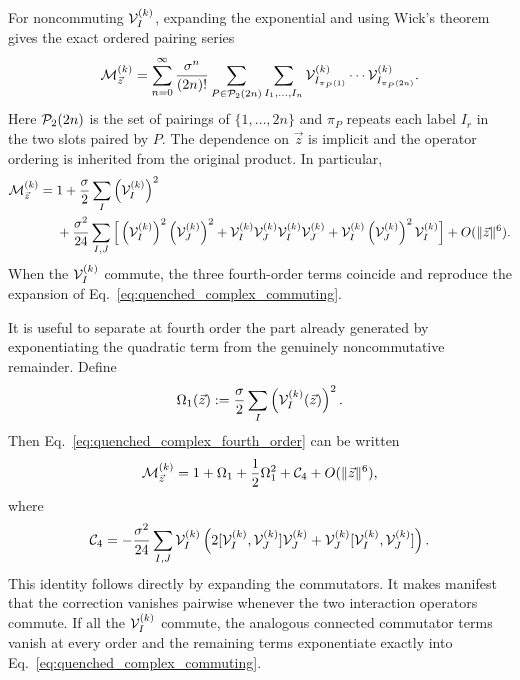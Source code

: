 \documentclass{article}
\theoremstyle{definition}
\begin{document}
For noncommuting ${\cal V}_I^{(k)}$, expanding the exponential and using Wick's theorem gives the exact ordered pairing series
\begin{equation}
    {\cal M}_{\vec z}^{(k)}
    =\sum_{n=0}^{\infty}\frac{\sigma^n}{(2n)!}
    \sum_{P\in{\cal P}_2(2n)}
    \sum_{I_1,\ldots,I_n}
    {\cal V}_{I_{\pi_P(1)}}^{(k)}\cdots
    {\cal V}_{I_{\pi_P(2n)}}^{(k)}.
    \label{eq:quenched_complex_ordered_wick}
\end{equation}
Here ${\cal P}_2(2n)$ is the set of pairings of $\{1,\ldots,2n\}$ and $\pi_P$ repeats each label $I_r$ in the two slots paired by $P$. The dependence on $\vec z$ is implicit and the operator ordering is inherited from the original product. In particular,
\begin{align}
    {\cal M}_{\vec z}^{(k)}={}&1
    +\frac{\sigma}{2}\sum_I\left({\cal V}_I^{(k)}\right)^2
    \nonumber\\
    &+\frac{\sigma^2}{24}\sum_{I,J}\Big[
        \left({\cal V}_I^{(k)}\right)^2
        \left({\cal V}_J^{(k)}\right)^2
        +{\cal V}_I^{(k)}{\cal V}_J^{(k)}
         {\cal V}_I^{(k)}{\cal V}_J^{(k)}
        +{\cal V}_I^{(k)}
         \left({\cal V}_J^{(k)}\right)^2
         {\cal V}_I^{(k)}
    \Big]+O(\|\vec z\|^6).
    \label{eq:quenched_complex_fourth_order}
\end{align}
When the ${\cal V}_I^{(k)}$ commute, the three fourth-order terms coincide and reproduce the expansion of Eq.~\eqref{eq:quenched_complex_commuting}.

It is useful to separate at fourth order the part already generated by exponentiating the quadratic term from the genuinely noncommutative remainder. Define
\begin{equation}
    \Omega_1(\vec z)
    :=\frac{\sigma}{2}\sum_I\left({\cal V}_I^{(k)}(\vec z)\right)^2.
    \label{eq:quenched_Omega1_complex}
\end{equation}
Then Eq.~\eqref{eq:quenched_complex_fourth_order} can be written
\begin{equation}
    {\cal M}_{\vec z}^{(k)}
    =1+\Omega_1+\frac12\Omega_1^2+{\cal C}_4+O(\|\vec z\|^6),
    \label{eq:quenched_fourth_split}
\end{equation}
where
\begin{equation}
    {\cal C}_4
    =-\frac{\sigma^2}{24}\sum_{I,J}
    {\cal V}_I^{(k)}\left(
        2[{\cal V}_I^{(k)},{\cal V}_J^{(k)}]{\cal V}_J^{(k)}
        +{\cal V}_J^{(k)}[{\cal V}_I^{(k)},{\cal V}_J^{(k)}]
    \right).
    \label{eq:quenched_C4_commutator}
\end{equation}
This identity follows directly by expanding the commutators. It makes manifest that the correction vanishes pairwise whenever the two interaction operators commute. If all the ${\cal V}_I^{(k)}$ commute, the analogous connected commutator terms vanish at every order and the remaining terms exponentiate exactly into Eq.~\eqref{eq:quenched_complex_commuting}.
\end{document}
